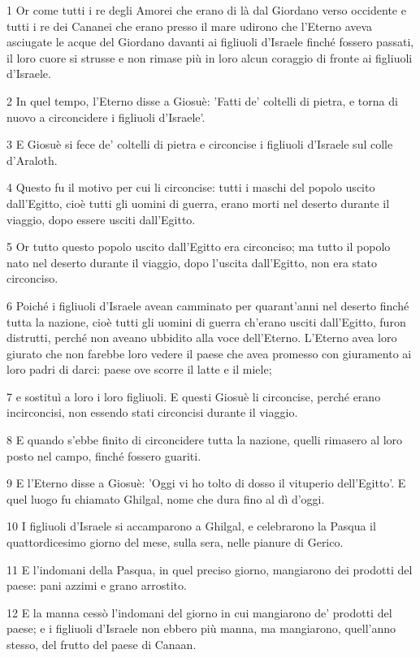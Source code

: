 \par 1 Or come tutti i re degli Amorei che erano di là dal Giordano verso occidente e tutti i re dei Cananei che erano presso il mare udirono che l'Eterno aveva asciugate le acque del Giordano davanti ai figliuoli d'Israele finché fossero passati, il loro cuore si strusse e non rimase più in loro alcun coraggio di fronte ai figliuoli d'Israele.
\par 2 In quel tempo, l'Eterno disse a Giosuè: 'Fatti de' coltelli di pietra, e torna di nuovo a circoncidere i figliuoli d'Israele'.
\par 3 E Giosuè si fece de' coltelli di pietra e circoncise i figliuoli d'Israele sul colle d'Araloth.
\par 4 Questo fu il motivo per cui li circoncise: tutti i maschi del popolo uscito dall'Egitto, cioè tutti gli uomini di guerra, erano morti nel deserto durante il viaggio, dopo essere usciti dall'Egitto.
\par 5 Or tutto questo popolo uscito dall'Egitto era circonciso; ma tutto il popolo nato nel deserto durante il viaggio, dopo l'uscita dall'Egitto, non era stato circonciso.
\par 6 Poiché i figliuoli d'Israele avean camminato per quarant'anni nel deserto finché tutta la nazione, cioè tutti gli uomini di guerra ch'erano usciti dall'Egitto, furon distrutti, perché non aveano ubbidito alla voce dell'Eterno. L'Eterno avea loro giurato che non farebbe loro vedere il paese che avea promesso con giuramento ai loro padri di darci: paese ove scorre il latte e il miele;
\par 7 e sostituì a loro i loro figliuoli. E questi Giosuè li circoncise, perché erano incirconcisi, non essendo stati circoncisi durante il viaggio.
\par 8 E quando s'ebbe finito di circoncidere tutta la nazione, quelli rimasero al loro posto nel campo, finché fossero guariti.
\par 9 E l'Eterno disse a Giosuè: 'Oggi vi ho tolto di dosso il vituperio dell'Egitto'. E quel luogo fu chiamato Ghilgal, nome che dura fino al dì d'oggi.
\par 10 I figliuoli d'Israele si accamparono a Ghilgal, e celebrarono la Pasqua il quattordicesimo giorno del mese, sulla sera, nelle pianure di Gerico.
\par 11 E l'indomani della Pasqua, in quel preciso giorno, mangiarono dei prodotti del paese: pani azzimi e grano arrostito.
\par 12 E la manna cessò l'indomani del giorno in cui mangiarono de' prodotti del paese; e i figliuoli d'Israele non ebbero più manna, ma mangiarono, quell'anno stesso, del frutto del paese di Canaan.

